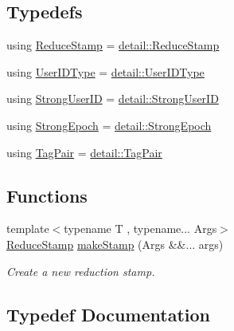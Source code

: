 \subsection*{Typedefs}
\begin{DoxyCompactItemize}
\item 
using \hyperlink{namespacevt_1_1collective_1_1reduce_a7b7cb3021ac5654d92825d9fab0250b2}{Reduce\+Stamp} = \hyperlink{namespacevt_1_1collective_1_1reduce_1_1detail_aacc1fcd729d934ba143fee3a943bf9e7}{detail\+::\+Reduce\+Stamp}
\item 
using \hyperlink{namespacevt_1_1collective_1_1reduce_a6cdf1adaf7aedc9df00c92fe55cdcecd}{User\+I\+D\+Type} = \hyperlink{namespacevt_1_1collective_1_1reduce_1_1detail_ae82d7b96b0885b9b7dfb0104398beead}{detail\+::\+User\+I\+D\+Type}
\item 
using \hyperlink{namespacevt_1_1collective_1_1reduce_a49e47347201b1b0fdb552ed4b7c86331}{Strong\+User\+ID} = \hyperlink{namespacevt_1_1collective_1_1reduce_1_1detail_af9e42b20d1be7dccc1b5e587f0387e02}{detail\+::\+Strong\+User\+ID}
\item 
using \hyperlink{namespacevt_1_1collective_1_1reduce_a0b5fbe1e89aea537d76fda4c57f2099e}{Strong\+Epoch} = \hyperlink{namespacevt_1_1collective_1_1reduce_1_1detail_a9e57fa5e7a2557a92ce0739edae200fe}{detail\+::\+Strong\+Epoch}
\item 
using \hyperlink{namespacevt_1_1collective_1_1reduce_ae3111ccd7e2214f079222e4c016b6652}{Tag\+Pair} = \hyperlink{structvt_1_1collective_1_1reduce_1_1detail_1_1_tag_pair}{detail\+::\+Tag\+Pair}
\end{DoxyCompactItemize}
\subsection*{Functions}
\begin{DoxyCompactItemize}
\item 
{\footnotesize template$<$typename T , typename... Args$>$ }\\\hyperlink{namespacevt_1_1collective_1_1reduce_a7b7cb3021ac5654d92825d9fab0250b2}{Reduce\+Stamp} \hyperlink{namespacevt_1_1collective_1_1reduce_a16bd926f0a7f318a75d2bf921b516db3}{make\+Stamp} (Args \&\&... args)
\begin{DoxyCompactList}\small\item\em Create a new reduction stamp. \end{DoxyCompactList}\end{DoxyCompactItemize}


\subsection{Typedef Documentation}
\mbox{\label{namespacevt_1_1collective_1_1reduce_a7b7cb3021ac5654d92825d9fab0250b2}} 
